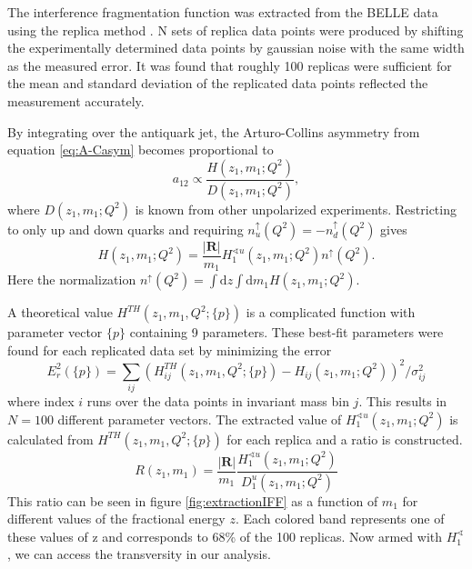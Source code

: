 \documentclass[abstract = on,listof=totoc, bibliography=totoc]{scrreprt}
\begin{document}
The interference fragmentation function was extracted from the BELLE data using the replica method \cite{extractIFF}. N sets of replica data points were produced by shifting the experimentally determined data points by gaussian noise with the same width as the measured error. It was found that roughly 100 replicas were sufficient for the mean and standard deviation of the replicated data points reflected the measurement accurately\cite{extractIFF2}. 

By integrating over the antiquark jet, the Arturo-Collins asymmetry from equation \ref{eq:A-Casym} becomes proportional to
\begin{equation}
a_{12} \propto \frac{H(z_1,m_1;Q^2)}{D(z_1,m_1;Q^2)},
\end{equation}
where $D(z_1,m_1;Q^2)$ is known from other unpolarized experiments. Restricting to only up and down quarks and requiring $n_u^\uparrow(Q^2) = -n_d^\uparrow(Q^2)$ gives
\begin{equation}
H(z_1,m_1;Q^2) = \frac{|\bm{R}|}{m_1}H_1^{\sphericalangle u}(z_1,m_1;Q^2)n^\uparrow(Q^2).
\end{equation}
Here the normalization $n^\uparrow(Q^2) = \int\text{d}z\int\text{d}m_1 H(z_1,m_1;Q^2)$. 

A theoretical value $H^{TH}(z_1,m_1,Q^2;\{p\})$ is a complicated function\cite{RealEstValTrans} with parameter vector $\{p\}$ containing 9 parameters. These best-fit parameters were found for each replicated data set by minimizing the error
\begin{equation}
E_r^2(\{p\}) = \sum\limits_{ij} \left(H_{ij}^{TH}(z_1,m_1,Q^2;\{p\}) - H_{ij}(z_1,m_1;Q^2)\right)^2/\sigma_{ij}^2
\end{equation}
where index $i$ runs over the data points in invariant mass bin $j$. This results in $N=100$ different parameter vectors. The extracted value of $H_1^{\sphericalangle u}(z_1,m_1;Q^2)$ is calculated from $H^{TH}(z_1,m_1,Q^2;\{p\})$ for each replica and a ratio is constructed.
\begin{equation}
R(z_1,m_1) = \frac{|\bm{R}|}{m_1} \frac{H_1^{\sphericalangle u}(z_1,m_1;Q^2)}{D_1^u(z_1,m_1;Q^2)}
\end{equation}
This ratio can be seen in figure \ref{fig:extractionIFF} as a function of $m_1$ for different values of the fractional energy $z$. Each colored band represents one of these values of z and corresponds to 68\% of the 100 replicas. Now armed with $H_1^\sphericalangle$, we can access the transversity in our analysis.  
\end{document}
